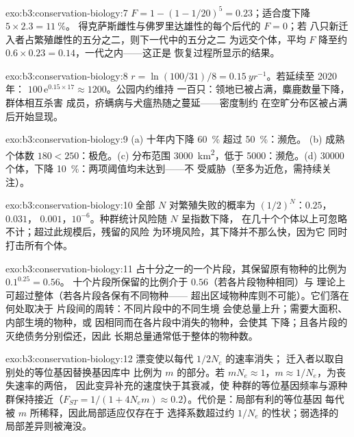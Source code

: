\begin{solution}{exo:b3:conservation-biology:7}
$F = 1 - (1 - 1/20)^{5} = 0.23$；适合度下降 $5\times 2.3 = \qty{11}{\%}$。
得克萨斯雌性与佛罗里达雄性的每个后代的 $F = 0$；若
八只新迁入者占繁殖雌性的五分之二，则下一代中的五分之二
为远交个体，平均 $F$ 降至约
$0.6\times 0.23 = 0.14$，一代之内——这正是
恢复过程所显示的结果。
\end{solution}

\begin{solution}{exo:b3:conservation-biology:8}
$r = \ln(100/31)/8 = \qty{0.15}{yr^{-1}}$。若延续至 2020 年：
$100\,\mathrm{e}^{0.15\times 17} \approx 1200$。公园内约维持
一百只：领地已被占满，麋鹿数量下降，群体相互杀害
成员，疥螨病与犬瘟热随之蔓延——密度制约
在空旷分布区被占满后开始显现。
\end{solution}

\begin{solution}{exo:b3:conservation-biology:9}
(a) 十年内下降 \qty{60}{\%} 超过 \qty{50}{\%}：濒危。
(b) 成熟个体数 $180 < 250$：极危。(c) 分布范围
\qty{3000}{km^2}，低于 \qty{5000}{}：濒危。(d) \num{30000}
个体，下降 \qty{10}{\%}：两项阈值均未达到——不
受威胁（至多为近危，需持续关注）。
\end{solution}

\begin{solution}{exo:b3:conservation-biology:10}
全部 $N$ 对繁殖失败的概率为 $(1/2)^{N}$：$0.25$，$0.031$，
$0.001$，$10^{-6}$。种群统计风险随 $N$ 呈指数下降，
在几十个个体以上可忽略不计；超过此规模后，残留的风险
为环境风险，其下降并不那么快，因为它
同时打击所有个体。
\end{solution}

\begin{solution}{exo:b3:conservation-biology:11}
占十分之一的一个片段，其保留原有物种的比例为 $0.1^{0.25} = 0.56$。
十个片段所保留的比例介于 $0.56$（若各片段物种相同）与
理论上可超过整体（若各片段各保有不同物种——
超出区域物种库则不可能）。它们落在何处取决于
片段间的周转：不同片段中的不同生境
会使总量上升；需要大面积、内部生境的物种，或
因相同而在各片段中消失的物种，会使其
下降；且各片段的灭绝债务分别偿还，因此
长期总量通常低于整体的物种数。
\end{solution}

\begin{solution}{exo:b3:conservation-biology:12}
漂变使以每代 $1/2N_{e}$ 的速率消失；
迁入者以取自别处的等位基因替换基因库中
比例为 $m$ 的部分。若 $mN_{e} \approx 1$，$m \approx 1/N_{e}$，为丧失速率的两倍，
因此变异补充的速度快于其衰减，使
种群的等位基因频率与源种群保持接近（$F_{ST} = 1/(1
+ 4N_{e}m) \approx 0.2$）。代价是：局部有利的等位基因
每代被 $m$ 所稀释，因此局部适应仅存在于
选择系数超过约 $1/N_{e}$ 的性状；弱选择的
局部差异则被淹没。
\end{solution}

